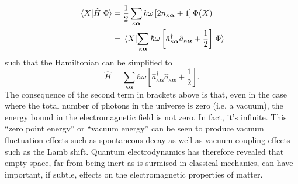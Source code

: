 \documentclass{article}
\numberwithin{equation}{section}
\begin{document}
\begin{equation} 
\begin{split}
\mel{X}{\hat{H}}{\Phi} &= \frac{1}{2}\sum_{\kappa\bm{\alpha}}\hbar\omega\left[2n_{\kappa\bm{\alpha}} + 1\right]\Phi(X)\\
&= \mel{X}{\sum_{\kappa\bm{\alpha}}\hbar\omega\left[\hat{a}_{\kappa\bm{\alpha}}^\dagger\hat{a}_{\kappa\bm{\alpha}} + \frac{1}{2}\right]}{\Phi}
\end{split}
\end{equation}
such that the Hamiltonian can be simplified to 
\begin{equation}\label{eq:Hhat5}
\hat{H} = \sum_{\kappa\bm{\alpha}}\hbar\omega\left[\hat{a}_{\kappa\bm{\alpha}}^\dagger\hat{a}_{\kappa\bm{\alpha}} + \frac{1}{2}\right].
\end{equation}
The consequence of the second term in brackets above is that, even in the case where the total number of photons in the universe is zero (i.e. a vacuum), the energy bound in the electromagnetic field is not zero. In fact, it's infinite. This ``zero point energy'' or ``vacuum energy'' can be seen to produce vacuum fluctuation effects such as spontaneous decay as well as vacuum coupling effects such as the Lamb shift. Quantum electrodynamics has therefore revealed that empty space, far from being inert as is surmised in classical mechanics, can have important, if subtle, effects on the electromagnetic properties of matter.
\end{document}
